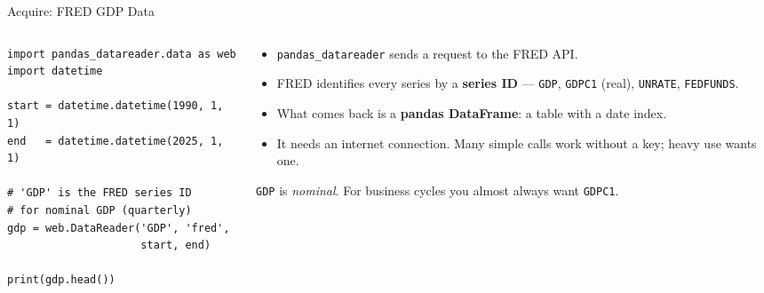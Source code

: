 \begin{frame}[fragile]{Acquire: FRED GDP Data}
\begin{columns}[T]
\begin{column}{0.52\textwidth}
\begin{lstlisting}
import pandas_datareader.data as web
import datetime

start = datetime.datetime(1990, 1, 1)
end   = datetime.datetime(2025, 1, 1)

# 'GDP' is the FRED series ID
# for nominal GDP (quarterly)
gdp = web.DataReader('GDP', 'fred',
                     start, end)

print(gdp.head())
\end{lstlisting}
\end{column}
\begin{column}{0.45\textwidth}
\small
\begin{itemize}\footnotesize
  \item \texttt{pandas\_datareader} sends a request to the FRED API.
  \item FRED identifies every series by a \textbf{series ID} --- \texttt{GDP}, \texttt{GDPC1} (real), \texttt{UNRATE}, \texttt{FEDFUNDS}.
  \item What comes back is a \textbf{pandas DataFrame}: a table with a date index.
  \item It needs an internet connection. Many simple calls work without a key; heavy use wants one.
\end{itemize}
\vspace{1mm}
\begin{cautionbox}\footnotesize
\texttt{GDP} is \emph{nominal}. For business cycles you almost always want \texttt{GDPC1}.
\end{cautionbox}
\end{column}
\end{columns}
\vspace{1mm}
\end{frame}

